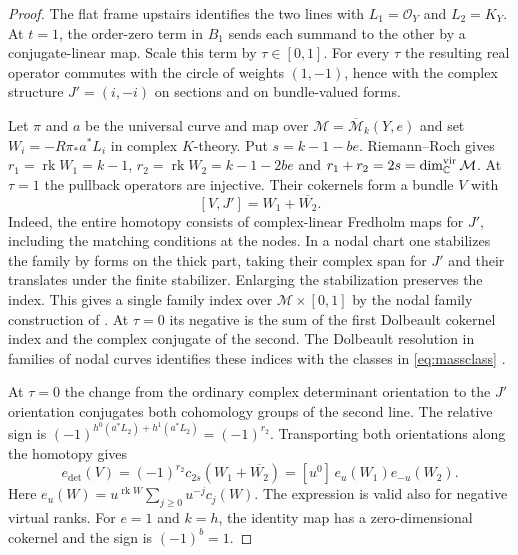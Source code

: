 \begin{proof}
The flat frame upstairs identifies the two lines with
$L_1=\mathcal O_Y$ and $L_2=K_Y$. At $t=1$, the order-zero term in
$B_1$ sends each summand to the other by a conjugate-linear map.
Scale this term by $\tau\in[0,1]$. For every $\tau$ the resulting
real operator commutes with the circle of weights $(1,-1)$, hence
with the complex structure $J'=(i,-i)$ on sections and on
bundle-valued forms.

Let $\pi$ and $a$ be the universal curve and map over
$\mathcal M=\overline{\mathcal M}_k(Y,e)$ and set
$W_i=-R\pi_*a^*L_i$ in complex $K$-theory. Put $s=k-1-be$.
Riemann--Roch gives $r_1=\operatorname{rk}W_1=k-1$,
$r_2=\operatorname{rk}W_2=k-1-2be$ and
$r_1+r_2=2s=\dim^{\mathrm{vir}}_{\mathbb C}\mathcal M$.
At $\tau=1$ the pullback operators are injective. Their cokernels
form a bundle $V$ with
\begin{equation}\label{eq:massclass}
 [V,J']=W_1+\overline{W_2}.
\end{equation}
Indeed, the entire homotopy consists of complex-linear Fredholm maps
for $J'$, including the matching conditions at the nodes. In a nodal
chart one stabilizes the family by forms on the thick part, taking
their complex span for $J'$ and their translates under the finite
stabilizer. Enlarging the stabilization preserves the index. This
gives a single family index over $\mathcal M\times[0,1]$ by the nodal
family construction of \cite[\S2.4]{zinger}. At $\tau=0$ its negative
is the sum of the first Dolbeault cokernel index and the complex
conjugate of the second. The Dolbeault resolution in families of nodal
curves identifies these indices with the classes in
\eqref{eq:massclass} \cite[\S4]{siebertnodal}.

At $\tau=0$ the change from the ordinary complex determinant
orientation to the $J'$ orientation conjugates both cohomology groups
of the second line. The relative sign is
$(-1)^{h^0(a^*L_2)+h^1(a^*L_2)}=(-1)^{r_2}$. Transporting both
orientations along the homotopy gives
\[
 e_{\mathrm{det}}(V)=(-1)^{r_2}c_{2s}(W_1+\overline{W_2})
      =[u^0]\,e_u(W_1)e_{-u}(W_2).
\]
Here $e_u(W)=u^{\operatorname{rk}W}\sum_{j\ge0}u^{-j}c_j(W)$.
The expression is valid also for negative virtual ranks. For $e=1$
and $k=h$, the identity map has a zero-dimensional cokernel and the
sign is $(-1)^b=1$.


\end{proof}
